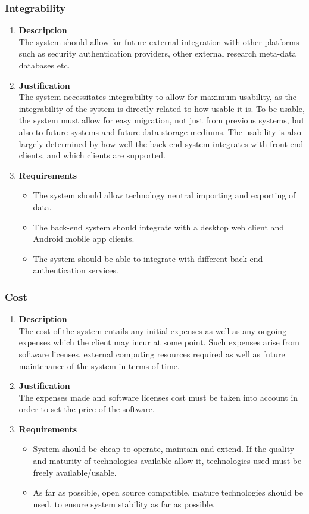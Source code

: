 \documentclass[a4paper,10pt]{article}
\begin{document}
\subsubsection{Integrability}
\begin{enumerate}
\item \textbf{Description} \\
The system should allow for future external integration with other platforms such as security authentication providers, other external research meta-data databases etc.
\item \textbf{Justification} \\
The system necessitates integrability to allow for maximum usability, as the integrability of the system is directly related to how usable it is. To be usable, the system must allow for easy migration, not just from previous systems, but also to future systems and future data storage mediums. The usability is also largely determined by how well the back-end system integrates with front end clients, and which clients are supported.
\item \textbf{Requirements}
	\begin{itemize}
		\item The system should allow technology neutral importing and exporting of data.
		\item The back-end system should integrate with a desktop web client and Android mobile app clients.
		\item The system should be able to integrate with different back-end authentication services.
	\end{itemize}
\end{enumerate}

\subsubsection{Cost}
\begin{enumerate}
\item \textbf{Description} \\
The cost of the system entails any initial expenses as well as any ongoing expenses which the client may incur at some point. Such expenses arise from software licenses, external computing resources required as well as future maintenance of the system in terms of time.
\item \textbf{Justification} \\
The expenses made and software licenses cost must be taken into account in order to set the price of the software.
\item \textbf{Requirements}
	\begin{itemize}
		\item System should be cheap to operate, maintain and extend. If the quality and maturity of technologies available allow it, technologies used must be freely available/usable.
		\item As far as possible, open source compatible, mature technologies should be used, to ensure system stability as far as possible.
	\end{itemize}
\end{enumerate}
\end{document}
